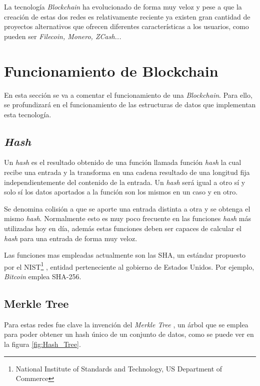 La tecnología \textit{Blockchain} ha evolucionado de forma muy veloz y pese a que la creación de estas dos redes es relativamente reciente ya existen gran cantidad de proyectos alternativos que ofrecen diferentes características a los usuarios, como pueden ser \textit{Filecoin, Monero, ZCash...}

\section{Funcionamiento de Blockchain}

En esta sección se va a comentar el funcionamiento de una \textit{Blockchain}. Para ello, se profundizará en el funcionamiento de las estructuras de datos que implementan esta tecnología.

\subsection{\textit{Hash}}
Un \textit{hash} es el resultado obtenido de una función llamada función \textit{hash} la cual recibe una entrada y la transforma en una cadena  resultado de una longitud fija independientemente del contenido de la entrada. Un \textit{hash} será igual a otro sí y solo sí los datos aportados a la función son los mismos en un caso y en otro\cite{enwiki:1158312728}.

Se denomina colisión a que se aporte una entrada distinta a otra y se obtenga el mismo \textit{hash}. Normalmente esto es muy poco frecuente en las funciones \textit{hash} más utilizadas hoy en día, además estas funciones deben ser capaces de calcular el \textit{hash} para una entrada de forma muy veloz.

Las funciones mas empleadas actualmente son las SHA, un estándar propuesto por el NIST\footnote{National Institute of Standards and Technology, US Department of Commerce} \cite{nistSHA}, entidad perteneciente al gobierno de Estados Unidos. Por ejemplo, \textit{Bitcoin} emplea SHA-256.


\subsection{Merkle Tree}
Para estas redes fue clave la invención del \textit{Merkle Tree} \cite{merkle1982method}, un árbol que se emplea para poder obtener un hash único de un conjunto de datos, como se puede ver en la figura \ref{fig:Hash_Tree}.



